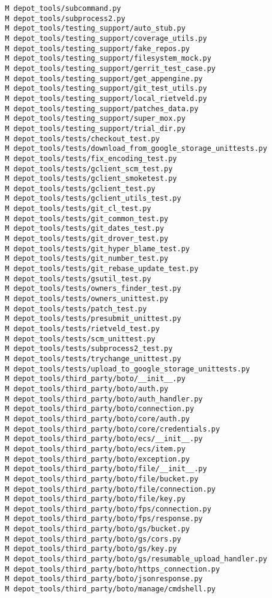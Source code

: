 \documentclass{article}
\begin{document}
\begin{verbatim}
 M depot_tools/subcommand.py
 M depot_tools/subprocess2.py
 M depot_tools/testing_support/auto_stub.py
 M depot_tools/testing_support/coverage_utils.py
 M depot_tools/testing_support/fake_repos.py
 M depot_tools/testing_support/filesystem_mock.py
 M depot_tools/testing_support/gerrit_test_case.py
 M depot_tools/testing_support/get_appengine.py
 M depot_tools/testing_support/git_test_utils.py
 M depot_tools/testing_support/local_rietveld.py
 M depot_tools/testing_support/patches_data.py
 M depot_tools/testing_support/super_mox.py
 M depot_tools/testing_support/trial_dir.py
 M depot_tools/tests/checkout_test.py
 M depot_tools/tests/download_from_google_storage_unittests.py
 M depot_tools/tests/fix_encoding_test.py
 M depot_tools/tests/gclient_scm_test.py
 M depot_tools/tests/gclient_smoketest.py
 M depot_tools/tests/gclient_test.py
 M depot_tools/tests/gclient_utils_test.py
 M depot_tools/tests/git_cl_test.py
 M depot_tools/tests/git_common_test.py
 M depot_tools/tests/git_dates_test.py
 M depot_tools/tests/git_drover_test.py
 M depot_tools/tests/git_hyper_blame_test.py
 M depot_tools/tests/git_number_test.py
 M depot_tools/tests/git_rebase_update_test.py
 M depot_tools/tests/gsutil_test.py
 M depot_tools/tests/owners_finder_test.py
 M depot_tools/tests/owners_unittest.py
 M depot_tools/tests/patch_test.py
 M depot_tools/tests/presubmit_unittest.py
 M depot_tools/tests/rietveld_test.py
 M depot_tools/tests/scm_unittest.py
 M depot_tools/tests/subprocess2_test.py
 M depot_tools/tests/trychange_unittest.py
 M depot_tools/tests/upload_to_google_storage_unittests.py
 M depot_tools/third_party/boto/__init__.py
 M depot_tools/third_party/boto/auth.py
 M depot_tools/third_party/boto/auth_handler.py
 M depot_tools/third_party/boto/connection.py
 M depot_tools/third_party/boto/core/auth.py
 M depot_tools/third_party/boto/core/credentials.py
 M depot_tools/third_party/boto/ecs/__init__.py
 M depot_tools/third_party/boto/ecs/item.py
 M depot_tools/third_party/boto/exception.py
 M depot_tools/third_party/boto/file/__init__.py
 M depot_tools/third_party/boto/file/bucket.py
 M depot_tools/third_party/boto/file/connection.py
 M depot_tools/third_party/boto/file/key.py
 M depot_tools/third_party/boto/fps/connection.py
 M depot_tools/third_party/boto/fps/response.py
 M depot_tools/third_party/boto/gs/bucket.py
 M depot_tools/third_party/boto/gs/cors.py
 M depot_tools/third_party/boto/gs/key.py
 M depot_tools/third_party/boto/gs/resumable_upload_handler.py
 M depot_tools/third_party/boto/https_connection.py
 M depot_tools/third_party/boto/jsonresponse.py
 M depot_tools/third_party/boto/manage/cmdshell.py

\end{verbatim}
\end{document}
